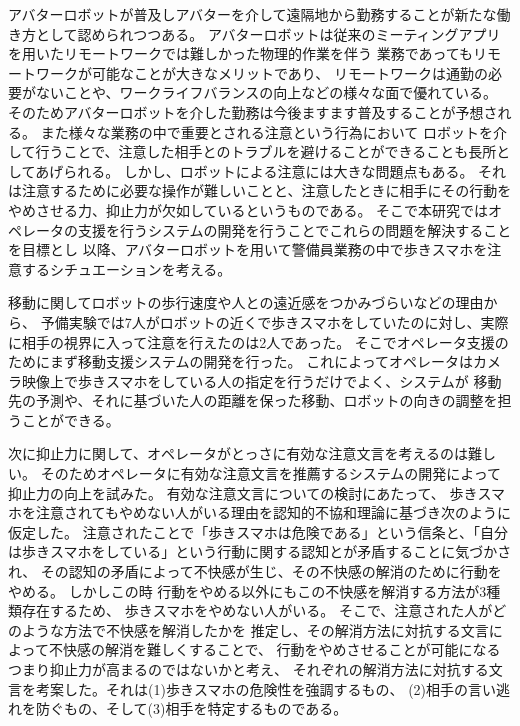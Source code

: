 \documentclass{kuisthesis}
\date{2024年1月31日}
\begin{document}
\maketitle

\begin{jabstract}


アバターロボットが普及しアバターを介して遠隔地から勤務することが新たな働き方として認められつつある。
アバターロボットは従来のミーティングアプリを用いたリモートワークでは難しかった物理的作業を伴う
業務であってもリモートワークが可能なことが大きなメリットであり、
リモートワークは通勤の必要がないことや、ワークライフバランスの向上などの様々な面で優れている。
そのためアバターロボットを介した勤務は今後ますます普及することが予想される。
また様々な業務の中で重要とされる注意という行為において
ロボットを介して行うことで、注意した相手とのトラブルを避けることができることも長所としてあげられる。
しかし、ロボットによる注意には大きな問題点もある。
それは注意するために必要な操作が難しいことと、注意したときに相手にその行動をやめさせる力、抑止力が欠如しているというものである。
そこで本研究ではオペレータの支援を行うシステムの開発を行うことでこれらの問題を解決することを目標とし
以降、アバターロボットを用いて警備員業務の中で歩きスマホを注意するシチュエーションを考える。

移動に関してロボットの歩行速度や人との遠近感をつかみづらいなどの理由から、
予備実験では7人がロボットの近くで歩きスマホをしていたのに対し、実際に相手の視界に入って注意を行えたのは2人であった。
そこでオペレータ支援のためにまず移動支援システムの開発を行った。
これによってオペレータはカメラ映像上で歩きスマホをしている人の指定を行うだけでよく、システムが
移動先の予測や、それに基づいた人の距離を保った移動、ロボットの向きの調整を担うことができる。

次に抑止力に関して、オペレータがとっさに有効な注意文言を考えるのは難しい。
そのためオペレータに有効な注意文言を推薦するシステムの開発によって抑止力の向上を試みた。
有効な注意文言についての検討にあたって、
歩きスマホを注意されてもやめない人がいる理由を認知的不協和理論に基づき次のように仮定した。
注意されたことで「歩きスマホは危険である」という信条と、「自分は歩きスマホをしている」という行動に関する認知とが矛盾することに気づかされ、
その認知の矛盾によって不快感が生じ、その不快感の解消のために行動をやめる。
しかしこの時
行動をやめる以外にもこの不快感を解消する方法が3種類存在するため、
歩きスマホをやめない人がいる。
そこで、注意された人がどのような方法で不快感を解消したかを
推定し、その解消方法に対抗する文言によって不快感の解消を難しくすることで、
行動をやめさせることが可能になるつまり抑止力が高まるのではないかと考え、
それぞれの解消方法に対抗する文言を考案した。それは(1)歩きスマホの危険性を強調するもの、
(2)相手の言い逃れを防ぐもの、そして(3)相手を特定するものである。


\end{jabstract}
\end{document}
